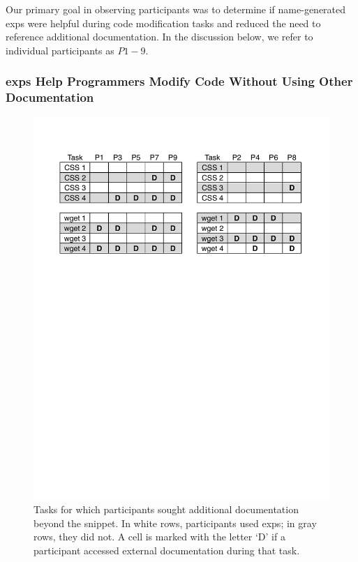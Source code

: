 Our primary goal in observing participants was to determine if \gls{name}-generated \glspl{exp} were helpful  during code modification tasks and reduced the need to reference additional documentation.
In the discussion below, we refer to individual participants as $P{1-9}$.

\subsubsection{\Glspl{exp} Help Programmers Modify Code Without Using Other Documentation}

\begin{figure}
\centering
\includegraphics[width=\columnwidth]{figures/doc_accesses}
\caption{%
Tasks for which participants sought additional documentation beyond the snippet. In white rows, participants used \glspl{exp}; in gray rows, they did not.
A cell is marked with the letter `D' if a participant accessed external documentation during that task.
}
\label{fig:doc_accesses}
\end{figure}

